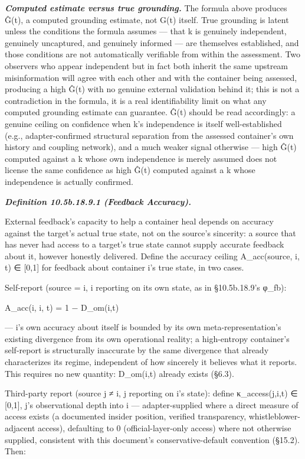 \documentclass[
]{article}
\begin{document}
\emph{\textbf{Computed estimate versus true grounding.}} The formula
above produces Ĝ(t), a computed grounding estimate, not G(t) itself.
True grounding is latent unless the conditions the formula assumes ---
that k is genuinely independent, genuinely uncaptured, and genuinely
informed --- are themselves established, and those conditions are not
automatically verifiable from within the assessment. Two observers who
appear independent but in fact both inherit the same upstream
misinformation will agree with each other and with the container being
assessed, producing a high Ĝ(t) with no genuine external validation
behind it; this is not a contradiction in the formula, it is a real
identifiability limit on what any computed grounding estimate can
guarantee. Ĝ(t) should be read accordingly: a genuine ceiling on
confidence when k's independence is itself well-established (e.g.,
adapter-confirmed structural separation from the assessed container's
own history and coupling network), and a much weaker signal otherwise
--- high Ĝ(t) computed against a k whose own independence is merely
assumed does not license the same confidence as high Ĝ(t) computed
against a k whose independence is actually confirmed.

\emph{\textbf{Definition 10.5b.18.9.1 (Feedback Accuracy).}}

External feedback's capacity to help a container heal depends on
accuracy against the target's actual true state, not on the source's
sincerity: a source that has never had access to a target's true state
cannot supply accurate feedback about it, however honestly delivered.
Define the accuracy ceiling A\_acc(source, i, t) ∈ {[}0,1{]} for
feedback about container i's true state, in two cases.

Self-report (source = i, i reporting on its own state, as in
§10.5b.18.9's φ\_fb):

A\_acc(i, i, t) = 1 − D\_om(i,t)

--- i's own accuracy about itself is bounded by its own
meta-representation's existing divergence from its own operational
reality; a high-entropy container's self-report is structurally
inaccurate by the same divergence that already characterizes its regime,
independent of how sincerely it believes what it reports. This requires
no new quantity: D\_om(i,t) already exists (§6.3).

Third-party report (source j ≠ i, j reporting on i's state): define
κ\_access(j,i,t) ∈ {[}0,1{]}, j's observational depth into i ---
adapter-supplied where a direct measure of access exists (a documented
insider position, verified transparency, whistleblower-adjacent access),
defaulting to 0 (official-layer-only access) where not otherwise
supplied, consistent with this document's conservative-default
convention (§15.2). Then:
\end{document}
